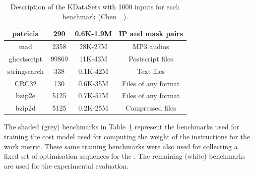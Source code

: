 \begin{table}[h]
{\begin{tabular}{|c|c|c|c|}
\rowcolor{gray!20}
patricia      & 290    & 0.6K-1.9M                  & IP and mask pairs              \\ \hline
\rowcolor{gray!20}
mad           & 2358   & 28K-27M                    & MP3 audios                     \\ \hline
\rowcolor{gray!20}
ghostscript   & 99869  & 11K-43M                    & Postscript files               \\ \hline
\rowcolor{gray!20}
stringsearch  & 338    &  0.1K-42M                 &  Text files                     \\ \hline
\rowcolor{gray!20}
CRC32         & 130    & 0.6K-35M                   & Files of any format            \\ \hline
\rowcolor{gray!20}
bzip2e        & 5125   & 0.7K-57M                   & Files of any format            \\ \hline
\rowcolor{gray!20}
bzip2d        & 5125   & 0.2K-25M                   & Compressed files               \\ \hline
\end{tabular}
}
\caption{Description of the KDataSets with 1000 inputs for each benchmark (Chen~\etal~\cite{chen10,chen12a}).}
\label{tab:kdatasets}
\end{table}

The shaded (grey) benchmarks in Table~\ref{tab:kdatasets} represent the benchmarks used for training the cost model used for computing the weight of the instructions for the work metric.
These same training benchmarks were also used for collecting a fixed set of optimisation sequences for the {\itercomp}.
The remaining (white) benchmarks are used for the experimental evaluation.

